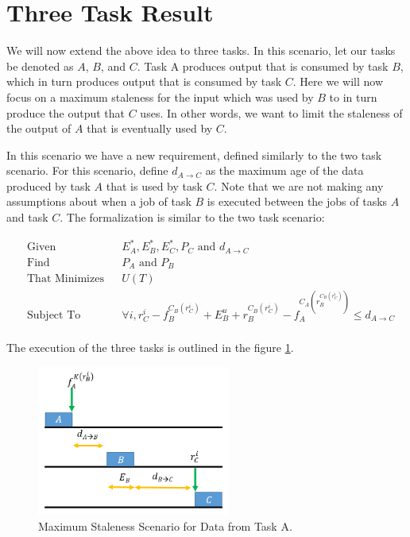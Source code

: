 \section{Three Task Result}

We will now extend the above idea to three tasks. In this scenario, let our tasks be denoted as $A$, $B$, and $C$. Task A produces output that is consumed by task $B$, which in turn produces output that is consumed by task $C$. Here we will now focus on a maximum staleness for the input which was used by $B$ to in turn produce the output that $C$ uses. In other words, we want to limit the staleness of the output of $A$ that is eventually used by $C$.

In this scenario we have a new requirement, defined similarly to the two task scenario. For this scenario, define $d_{A \to C}$ as the maximum age of the data produced by task $A$ that is used by task $C$. Note that we are not making any assumptions about when a job of task $B$ is executed between the jobs of tasks $A$ and task $C$. The formalization is similar to the two task scenario:

\begin{equation*}
	\begin{aligned}
		& \text{Given}
		& & E^*_A, E^*_B, E^*_C, P_C \text{ and } d_{A \to C} \\
		& \text{Find}
		& & P_A \text{ and } P_B \\
		& \text{That Minimizes}
		& & U(T) \\
		& \text{Subject To}
		& & \forall i, r^i_C - f_B^{C_B(r^i_C)} + E^u_B + r_B^{C_B(r^i_C)} - f_A^{C_A(r_B^{C_B(r^i_C)})} \leq d_{A \to C} \\
	\end{aligned}
\end{equation*}

The execution of the three tasks is outlined in the figure \ref{fig:3Tasks}.

\begin{figure}[!ht]
	\centering
	\includegraphics[width=2.5in]{figures/3TaskMaxStaleness}
	\caption{Maximum Staleness Scenario for Data from Task A.}
	\label{fig:3Tasks}
\end{figure}


